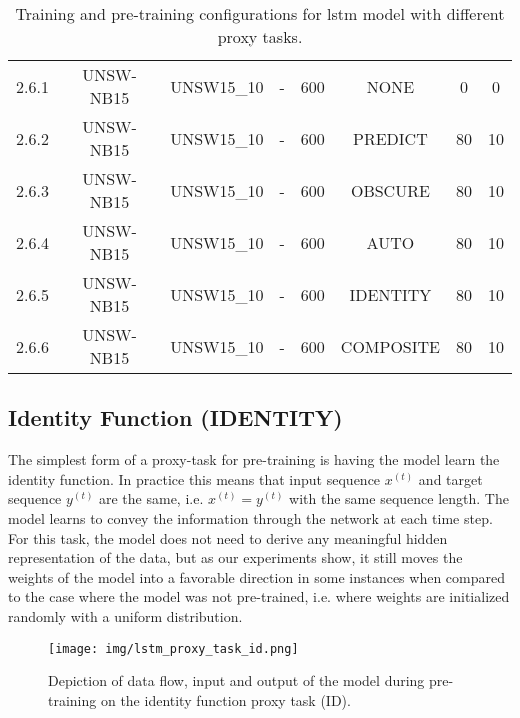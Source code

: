 \begin{table}[h]
{\begin{tabular}{cccccccc}
		2.6.1 \label{ex_2_6_1} & UNSW-NB15    & UNSW15\_10 & -           & 600           & NONE       & 0         & 0           \\
		2.6.2 \label{ex_2_6_2} & UNSW-NB15    & UNSW15\_10 & -           & 600           & PREDICT    & 80        & 10          \\
		2.6.3 \label{ex_2_6_3} & UNSW-NB15    & UNSW15\_10 & -           & 600           & OBSCURE      & 80        & 10          \\
		2.6.4 \label{ex_2_6_4} & UNSW-NB15    & UNSW15\_10 & -           & 600           & AUTO       & 80        & 10          \\
		2.6.5 \label{ex_2_6_5} & UNSW-NB15    & UNSW15\_10 & -           & 600           & IDENTITY   & 80        & 10          \\
		2.6.6 \label{ex_2_6_6} & UNSW-NB15    & UNSW15\_10 & -           & 600           & COMPOSITE  & 80        & 10         
	\end{tabular}}
	\caption{Training and pre-training configurations for \gls{lstm} model with different proxy tasks.}
	\label{table:experiments:lstm:configurations}
\end{table}

\subsection{Identity Function (IDENTITY)} \label{sec:experiments:lstm:identity}

The simplest form of a proxy-task for pre-training is having the model learn the identity function. In practice this means that input sequence $x^{(t)}$ and target sequence $y^{(t)}$ are the same, i.e. $x^{(t)} = y^{(t)}$ with the same sequence length. The model learns to convey the information through the network at each time step. For this task, the model does not need to derive any meaningful hidden representation of the data, but as our experiments show, it still moves the weights of the model into a favorable direction in some instances when compared to the case where the model was not pre-trained, i.e. where weights are initialized randomly with a uniform distribution.

\begin{figure}[h]
	\centering
	\texttt{[image: img/lstm\_proxy\_task\_id.png]}
	\caption{Depiction of data flow, input and output of the model during pre-training on the identity function proxy task (ID). }
	\label{fig:experiments:lstm_proxy_task_id}
\end{figure}

